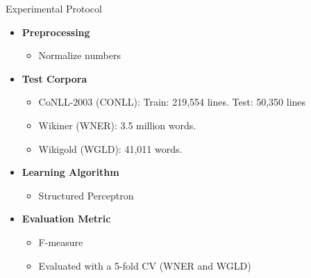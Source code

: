 \documentclass[10pt,=table]{beamer}
\begin{document}



\begin{frame}{Experimental Protocol}
	\begin{itemize}
		\item<1-> \large \textbf{Preprocessing}
			\begin{itemize}
				\item<1-> Normalize numbers
			\end{itemize}
		\item<2-> \textbf{Test Corpora}
			\begin{itemize}
			\item<2-> CoNLL-2003 (CONLL): Train: 219,554 lines. Test: 50,350 lines
			\item<2-> Wikiner (WNER): 3.5 million words. 
			\item<2-> Wikigold (WGLD): 41,011 words. 
			\end{itemize}
		\item<3-> \textbf{Learning Algorithm}
			\begin{itemize}
				\item<3-> Structured Perceptron 
			\end{itemize}

		\item<4-> \textbf{Evaluation Metric}
			\begin{itemize}
				\item<4-> F-measure
				\item<4-> Evaluated with a 5-fold CV (WNER and WGLD)
			\end{itemize}
	\end{itemize}	 
	\vspace{\textheight}
\end{frame}
\end{document}
